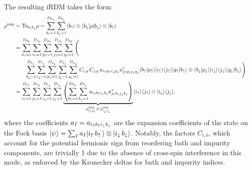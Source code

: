 \documentclass[edipack2.tex]{subfiles}
\begin{document}
The resulting iRDM takes the form:
\begin{equation}
  \label{iRDMnormal}
  \begin{aligned}
  \rho^\mathrm{imp} &= {\rm Tr}_{b_\uparrow b_\downarrow}{\rho} = 
  \sum_{b_\uparrow=1}^{D_{b_\uparrow}}
  \sum_{b_\downarrow=1}^{D_{b_\downarrow}}
  \langle b_\uparrow|\otimes\langle b_\downarrow|
    \rho
    |b_\downarrow\rangle\otimes|b_\uparrow\rangle    \cr
    &=
    \sum_{b_\uparrow=1}^{D_{b_\uparrow}}
    \sum_{i_\uparrow=1}^{D_{i_\uparrow}}
    \sum_{p_\uparrow=1}^{D_{p_\uparrow}}
    \sum_{j_\uparrow=1}^{D_{j_\uparrow}} 
    \sum_{q_\uparrow=1}^{D_{q_\uparrow}}
    \Bigg( \cr
    &\qquad
    \sum_{b_\downarrow=1}^{D_{b_\downarrow}}
    \sum_{i_\downarrow=1}^{D_{i_\downarrow}}
    \sum_{p_\downarrow=1}^{D_{p_\downarrow}}
    \sum_{j_\downarrow=1}^{D_{j_\downarrow}} 
    \sum_{q_\downarrow=1}^{D_{q_\downarrow}}
    C_{i,p}\,C_{j,q}\,a_{i_\uparrow p_\uparrow i_\downarrow p_\downarrow} a^*_{j_\uparrow q_\uparrow j_\downarrow q_\downarrow}
    \langle b_\uparrow| p_\uparrow\rangle| i_\uparrow\rangle\langle j_\uparrow |\langle q_\uparrow| b_\uparrow\rangle   \otimes \langle b_\downarrow| p_\downarrow \rangle|i_\downarrow\rangle \langle j_\downarrow  |\langle q_\downarrow| b_\downarrow\rangle \Bigg)
    \cr
&=
    \sum_{i_\uparrow=1}^{D_{i_\uparrow}}
    \sum_{j_\uparrow=1}^{D_{j_\uparrow}}
    \sum_{i_\downarrow=1}^{D_{i_\downarrow}}
    \sum_{j_\downarrow=1}^{D_{j_\downarrow}}
    \underbrace{\left(
    \sum_{b_\uparrow=1}^{D_{b_\uparrow}}
    \sum_{b_\downarrow=1}^{D_{b_\downarrow}}
    a_{i_\uparrow b_\uparrow i_\downarrow b_\downarrow} a^*_{j_\uparrow b_\uparrow j_\downarrow b_\downarrow}
    \right)}_{\rho^\mathrm{imp}_{i_\uparrow j_\uparrow} \otimes\, \rho^\mathrm{imp}_{i_\downarrow j_\downarrow} }
    |i_\uparrow\rangle\langle j_\uparrow|\otimes |i_\downarrow\rangle\langle j_\downarrow|,
  \end{aligned}
\end{equation}
where the coefficients $a_I = a_{i_\uparrow b_\uparrow i_\downarrow b_\downarrow}$ are the
expansion coefficients of the state on the Fock basis
$|\psi\rangle = \sum_I a_I |i_\uparrow\,  b_\uparrow\,\rangle \otimes |i_\downarrow
  \, b_\downarrow\rangle$.
Notably, the factors $C_{i,b}$, which account for the potential 
fermionic sign from reordering bath and impurity components, are 
trivially 1 due to the absence of cross-spin interference in this 
mode, as enforced by the Kronecker deltas for bath and impurity 
indices.
\end{document}
